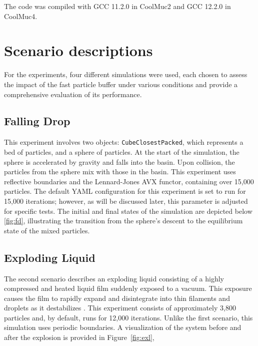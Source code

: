 The code was compiled with GCC 11.2.0 in CoolMuc2 and GCC 12.2.0 in CoolMuc4. 



\section{Scenario descriptions}

For the experiments, four different simulations were used, each chosen to assess the impact of the fast particle buffer under various conditions and provide a comprehensive evaluation of its performance.



\subsection{Falling Drop} 
This experiment involves two objects: \texttt{CubeClosestPacked}, which represents a bed of particles, and a sphere of particles. At the start of the simulation, the sphere is accelerated by gravity and falls into the basin. Upon collision, the particles from the sphere mix with those in the basin. This experiment uses reflective boundaries and the Lennard-Jones AVX functor, containing over 15,000 particles. The default YAML configuration for this experiment is set to run for 15,000 iterations; however, as will be discussed later, this parameter is adjusted for specific tests. The initial and final states of the simulation are depicted below \ref{fig:fd}, illustrating the transition from the sphere's descent to the equilibrium state of the mixed particles.

\subsection{Exploding Liquid} The second scenario describes an exploding liquid consisting of a highly compressed and heated liquid film suddenly exposed to a vacuum. This exposure causes the film to rapidly expand and disintegrate into thin filaments and droplets as it destabilizes \parencite{seckler2021autopas}. This experiment consists of approximately 3,800 particles and, by default, runs for 12,000 iterations. Unlike the first scenario, this simulation uses periodic boundaries. A visualization of the system before and after the explosion is provided in Figure~\ref{fig:exl},

